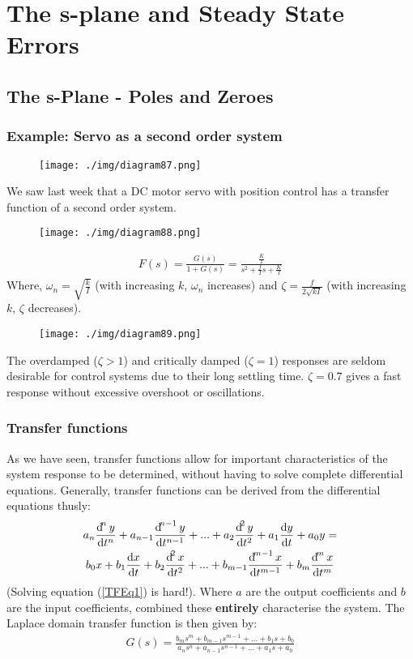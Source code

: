 \chapter{The s-plane and Steady State Errors}
\section{The s-Plane - Poles and Zeroes}
\subsection{Example: Servo as a second order system}
\begin{figure}[H]
  \centering
  \texttt{[image: ./img/diagram87.png]}
  \caption{}
\end{figure}
We saw last week that a DC motor servo with position control has a transfer function of a second order system.
\begin{figure}[H]
  \centering
  \texttt{[image: ./img/diagram88.png]}
  \caption{}
\end{figure}
\begin{align}
  F(s) = \frac{G(s)}{1+G(s)} = \frac{\frac{K}{I}}{s^2 + \frac{f}{I}s + \frac{K}{I}}
\end{align}
Where, $\omega_n = \sqrt{\frac{k}{I}}$ (with increasing $k$, $\omega_n$ increases) and $\zeta = \frac{f}{2\sqrt{kI}}$ (with increasing $k$, $\zeta$ decreases).
\begin{figure}[H]
  \centering
  \texttt{[image: ./img/diagram89.png]}
  \caption{}
\end{figure}
The overdamped ($\zeta > 1$) and critically damped ($\zeta = 1$) responses are seldom desirable for control systems due to their long settling time. $\zeta = 0.7$ gives a fast response without excessive overshoot or oscillations.
\subsection{Transfer functions}
As we have seen, transfer functions allow for important characteristics of the system response to be determined, without having to solve complete differential equations. Generally, transfer functions can be derived from the differential equations thusly:
\begin{multline}
  a_n \frac{\dif^n y}{\dif t^n} + a_{n-1}\frac{\dif^{n-1} y}{\dif t^{n-1}} + ... + a_2 \frac{\dif^2 y}{\dif t^2} + a_1 \frac{\dif y}{\dif t} + a_0 y =\\ b_0 x + b_1 \frac{\dif x}{\dif t} + b_2 \frac{\dif^2 x}{\dif t^2} + ... + b_{m-1}\frac{\dif^{m-1} x}{\dif t^{m-1}} + b_m \frac{\dif^{m} x}{\dif t^m} \label{TFEq1}
\end{multline}
(Solving equation (\ref{TFEq1}) is hard!). Where $a$ are the output coefficients and $b$ are the input coefficients, combined these \textbf{entirely} characterise the system. The Laplace domain transfer function is then given by:
\begin{align}
  G(s) = \frac{b_m s^m + b_{m-1} s^{m-1} + ... + b_1 s + b_0}{a_n s^n + a_{n-1} s^{n-1} + ... + a_1 s + a_0}
\end{align}
